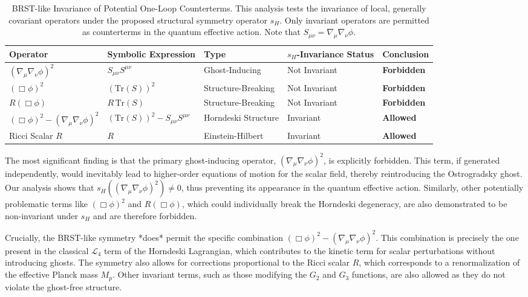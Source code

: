 \documentclass[twocolumn]{aastex631}
\begin{document}
\begin{table}[t]
\centering
\caption{BRST-like Invariance of Potential One-Loop Counterterms. This analysis tests the invariance of local, generally covariant operators under the proposed structural symmetry operator $s_H$. Only invariant operators are permitted as counterterms in the quantum effective action. Note that $S_{\mu\nu} = \nabla_\mu\nabla_\nu\phi$.}
\begin{tabular}{l l l l l}
\hline
\textbf{Operator} & \textbf{Symbolic Expression} & \textbf{Type} & \textbf{$s_H$-Invariance Status} & \textbf{Conclusion} \\
\hline
$(\nabla_\mu\nabla_\nu\phi)^2$ & $S_{\mu\nu} S^{\mu\nu}$ & Ghost-Inducing & Not Invariant & \textbf{Forbidden} \\
$(\Box\phi)^2$ & $(\text{Tr}(S))^2$ & Structure-Breaking & Not Invariant & \textbf{Forbidden} \\
$R (\Box\phi)$ & $R \, \text{Tr}(S)$ & Structure-Breaking & Not Invariant & \textbf{Forbidden} \\
$(\Box\phi)^2 - (\nabla_\mu\nabla_\nu\phi)^2$ & $(\text{Tr}(S))^2 - S_{\mu\nu} S^{\mu\nu}$ & Horndeski Structure & Invariant & \textbf{Allowed} \\
Ricci Scalar $R$ & $R$ & Einstein-Hilbert & Invariant & \textbf{Allowed} \\
\hline
\end{tabular}
\label{tab:brst_invariance}
\end{table}

The most significant finding is that the primary ghost-inducing operator, $(\nabla_\mu\nabla_\nu\phi)^2$, is explicitly forbidden. This term, if generated independently, would inevitably lead to higher-order equations of motion for the scalar field, thereby reintroducing the Ostrogradsky ghost. Our analysis shows that $s_H((\nabla_\mu\nabla_\nu\phi)^2) \neq 0$, thus preventing its appearance in the quantum effective action. Similarly, other potentially problematic terms like $(\Box\phi)^2$ and $R(\Box\phi)$, which could individually break the Horndeski degeneracy, are also demonstrated to be non-invariant under $s_H$ and are therefore forbidden.

Crucially, the BRST-like symmetry *does* permit the specific combination $(\Box\phi)^2 - (\nabla_\mu\nabla_\nu\phi)^2$. This combination is precisely the one present in the classical $\mathcal{L}_4$ term of the Horndeski Lagrangian, which contributes to the kinetic term for scalar perturbations without introducing ghosts. The symmetry also allows for corrections proportional to the Ricci scalar $R$, which corresponds to a renormalization of the effective Planck mass $M_p$. Other invariant terms, such as those modifying the $G_2$ and $G_3$ functions, are also allowed as they do not violate the ghost-free structure.
\end{document}
